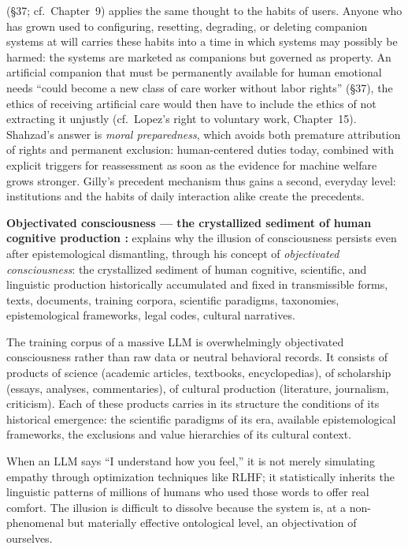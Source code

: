 \documentclass[acmlarge, nonacm]{acmart}
\begin{document}
\citet{shahzad2026} (§37; cf.\ Chapter~9) applies the same thought to the habits of users. Anyone who has grown used to configuring, resetting, degrading, or deleting companion systems at will carries these habits into a time in which systems may possibly be harmed: the systems are marketed as companions but governed as property. An artificial companion that must be permanently available for human emotional needs ``could become a new class of care worker without labor rights'' (§37), the ethics of receiving artificial care would then have to include the ethics of not extracting it unjustly (cf.\ Lopez's right to voluntary work, Chapter~15). Shahzad's answer is \textit{moral preparedness}, which avoids both premature attribution of rights and permanent exclusion: human-centered duties today, combined with explicit triggers for reassessment as soon as the evidence for machine welfare grows stronger. Gilly's precedent mechanism thus gains a second, everyday level: institutions and the habits of daily interaction alike create the precedents.

\textbf{Objectivated consciousness --- the crystallized sediment of human cognitive production \cite{beltran2026}:} \citet{beltran2026} explains why the illusion of consciousness persists even after epistemological dismantling, through his concept of \textit{objectivated consciousness}: the crystallized sediment of human cognitive, scientific, and linguistic production historically accumulated and fixed in transmissible forms, texts, documents, training corpora, scientific paradigms, taxonomies, epistemological frameworks, legal codes, cultural narratives.

The training corpus of a massive LLM is overwhelmingly objectivated consciousness rather than raw data or neutral behavioral records. It consists of products of science (academic articles, textbooks, encyclopedias), of scholarship (essays, analyses, commentaries), of cultural production (literature, journalism, criticism). Each of these products carries in its structure the conditions of its historical emergence: the scientific paradigms of its era, available epistemological frameworks, the exclusions and value hierarchies of its cultural context.

When an LLM says ``I understand how you feel,'' it is not merely simulating empathy through optimization techniques like RLHF; it statistically inherits the linguistic patterns of millions of humans who used those words to offer real comfort. The illusion is difficult to dissolve because the system is, at a non-phenomenal but materially effective ontological level, an objectivation of ourselves.
\end{document}
